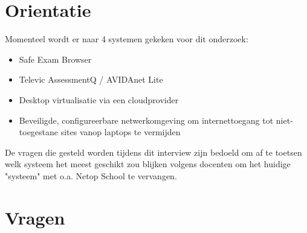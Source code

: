 
\section{Orientatie}

Momenteel wordt er naar 4 systemen gekeken voor dit onderzoek:
\begin{itemize}
	\item Safe Exam Browser 
	\item Televic AssessmentQ / AVIDAnet Lite
	\item Desktop virtualisatie via een cloudprovider
	\item Beveiligde, configureerbare netwerkomgeving om internettoegang tot niet-toegestane sites vanop laptops te vermijden
\end{itemize}
De vragen die gesteld worden tijdens dit interview zijn bedoeld om af te toetsen welk systeem het meest geschikt zou blijken volgens docenten om het huidige "systeem" met o.a. Netop School te vervangen. 
\newpage
\section{Vragen}

